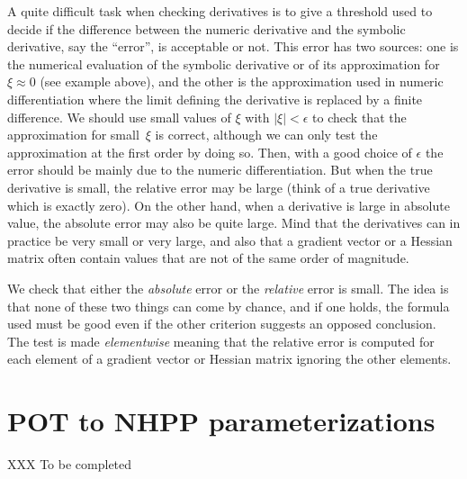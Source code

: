 \documentclass[11pt]{article}\usepackage[]{graphicx}\usepackage[]{xcolor}
\begin{document}
A quite difficult task when checking derivatives is to give a
threshold used to decide if the difference between the numeric
derivative and the symbolic derivative, say the ``error'', is
acceptable or not. This error has two sources: one is the numerical
evaluation of the symbolic derivative or of its approximation for
$\xi \approx 0$ (see example above), and the other is the
approximation used in numeric differentiation where the limit defining
the derivative is replaced by a finite difference.  We should use
small values of $\xi$ with $|\xi| < \epsilon$ to check that the
approximation for small~$\xi$ is correct, although we can only test
the approximation at the first order by doing so. Then, with a good
choice of $\epsilon$ the error should be mainly due to the numeric
differentiation. But when the true derivative is small, the relative
error may be large (think of a true derivative which is exactly zero).
On the other hand, when a derivative is large in absolute value, the
absolute error may also be quite large.  Mind that the derivatives can
in practice be very small or very large, and also that a gradient
vector or a Hessian matrix often contain values that are not of the
same order of magnitude.

We check that either the \textit{absolute} error or the
\textit{relative} error is small. The idea is that none of these two
things can come by chance, and if one holds, the formula used must be
good even if the other criterion suggests an opposed conclusion. The
test is made \textit{elementwise} meaning that the relative error is
computed for each element of a gradient vector or Hessian matrix
ignoring the other elements.

\section{POT to NHPP parameterizations}

XXX To be completed




\end{document}
